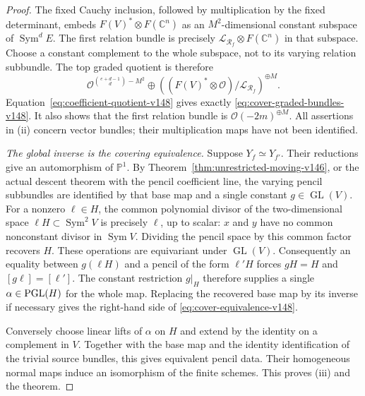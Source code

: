 \documentclass[11pt,reqno]{amsart}
\numberwithin{equation}{section}
\theoremstyle{definition}\newtheorem{definition}[theorem]{Definition}
\theoremstyle{remark}\newtheorem{remark}[theorem]{Remark}
\newcommand{\C}{\mathbb C}\newcommand{\Q}{\mathbb Q}
\newcommand{\Pj}{\mathbb P}\newcommand{\A}{\mathbb A}
\newcommand{\OO}{\mathcal O}\newcommand{\II}{\mathcal I}
\DeclareMathOperator{\Sym}{Sym}\DeclareMathOperator{\Gr}{Gr}
\begin{document}
\begin{proof}
The fixed Cauchy inclusion, followed by multiplication by the
fixed determinant, embeds
\(F(V)^*\otimes F(\C^n)\) as an \(M^2\)-dimensional
constant subspace of \(\Sym^d E\).
The first relation bundle is precisely
\(\mathcal L_{\mathcal R_f}\otimes F(\C^n)\) in that
subspace.  Choose a constant complement to the whole subspace,
not to its varying relation subbundle.  The top graded quotient is
therefore
\[
 \OO^{\binom{e+d-1}{d}-M^2}
 \oplus\left((F(V)^*\otimes\OO)/
                         \mathcal L_{\mathcal R_f}\right)^{\oplus M}.
\]
Equation~\eqref{eq:coefficient-quotient-v148} gives exactly
\eqref{eq:cover-graded-bundles-v148}.  It also shows that the
first relation bundle is \(\OO(-2m)^{\oplus M}\).
All assertions in (ii) concern vector bundles; their
multiplication maps have not been identified.

\emph{The global inverse is the covering equivalence.}
Suppose \(Y_f\simeq Y_{f'}\).  Their reductions give an
automorphism of \(\Pj^1\).  By
Theorem~\ref{thm:unrestricted-moving-v146}, or the actual
descent theorem with the pencil coefficient line, the varying
pencil subbundles are identified by that base map and a single
constant \(g\in\operatorname{GL}(V)\).
For a nonzero \(\ell\in H\), the common polynomial divisor
of the two-dimensional space \(\ell H\subset\Sym^2V\)
is precisely \(\ell\), up to scalar: \(x\) and \(y\)
have no common nonconstant divisor in \(\Sym V\).
Dividing the pencil space by this common factor recovers \(H\).
These operations are equivariant under \(\operatorname{GL}(V)\).
Consequently an equality between \(g(\ell H)\) and a pencil
of the form \(\ell'H\) forces \(gH=H\) and
\([g\ell]=[\ell']\).  The constant restriction \(g|_H\)
therefore supplies a single \(\alpha\in\operatorname{PGL}(H)\) for the
whole map.  Replacing the recovered base map by its inverse if
necessary gives the right-hand side of
\eqref{eq:cover-equivalence-v148}.

Conversely choose linear lifts of \(\alpha\) on \(H\) and
extend by the identity on a complement in \(V\).  Together with
the base map and the identity identification of the trivial source
bundles, this gives equivalent pencil data.  Their homogeneous
normal maps induce an isomorphism of the finite schemes.  This
proves (iii) and the theorem.
\end{proof}
\end{document}
